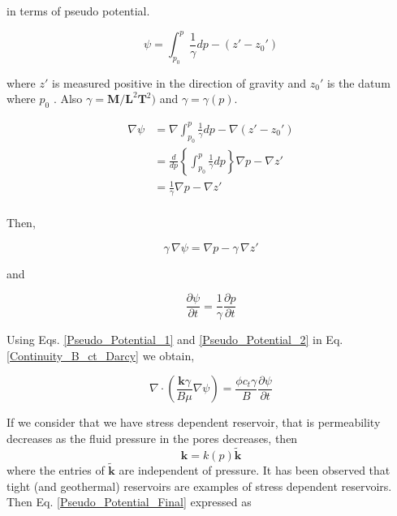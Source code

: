 \documentclass{llncs}
\numberwithin{equation}{section}
\numberwithin{figure}{section}
\numberwithin{table}{section}
\begin{document}
     in terms of pseudo potential.

    \begin{equation}
        \psi =\int_{{{p}_{0}}}^{p}{\frac{1}{\gamma }dp}-\left( z'-{{z}_{0}}' \right)
    \label{Pseudo_Potential}
    \end{equation}

    where $z'$ is measured positive in the direction of gravity and ${{z}_{0}}'$ is the datum where ${{p}_{0}}$ . Also $\gamma=\mathbf{M}/\mathbf{L}^{2}\mathbf{T}^{2})$ and $\gamma=\gamma(p)$.

    \begin{equation*}
        \begin{split}
             \nabla \psi & =\nabla \int_{{{p}_{0}}}^{p}{\frac{1}{\gamma }dp}-\nabla \left( z'-{{z}_{0}}' \right) \\
            & =\frac{d}{dp}\left\{ \int_{{{p}_{0}}}^{p}{\frac{1}{\gamma }dp} \right\}\nabla p-\nabla z' \\
            & =\frac{1}{\gamma }\nabla p-\nabla z' \\
        \end{split}
    \end{equation*}

    Then,

    \begin{equation}
        \gamma \,\nabla \psi =\nabla p-\gamma \,\nabla z'
    \label{Pseudo_Potential_1}
    \end{equation}

    and

    \begin{equation}
        \frac{\partial \psi }{\partial t}=\frac{1}{\gamma }\frac{\partial p}{\partial t}
    \label{Pseudo_Potential_2}
    \end{equation}

    Using Eqs. \ref{Pseudo_Potential_1} and \ref{Pseudo_Potential_2} in Eq. \ref{Continuity_B_ct_Darcy} we obtain,

    \begin{equation}
        \nabla \cdot \left( \frac{\mathbf{k}\gamma }{B\mu }\nabla \psi  \right)=\frac{\phi {{c}_{t}}\gamma }{B}\frac{\partial \psi }{\partial t}
    \label{Pseudo_Potential_Final}
    \end{equation}

    If we consider that we have stress dependent reservoir, that is permeability decreases as the fluid pressure in the pores decreases, then
    \begin{equation*}
        \mathbf{k}=k\left( p \right)\widetilde{\mathbf{k}}
    \end{equation*}
        where the entries of $\widetilde{\mathbf{k}}$ are independent of pressure. It has been observed that tight (and geothermal) reservoirs are  examples of stress dependent reservoirs. Then Eq. \ref{Pseudo_Potential_Final}  expressed as
\end{document}
